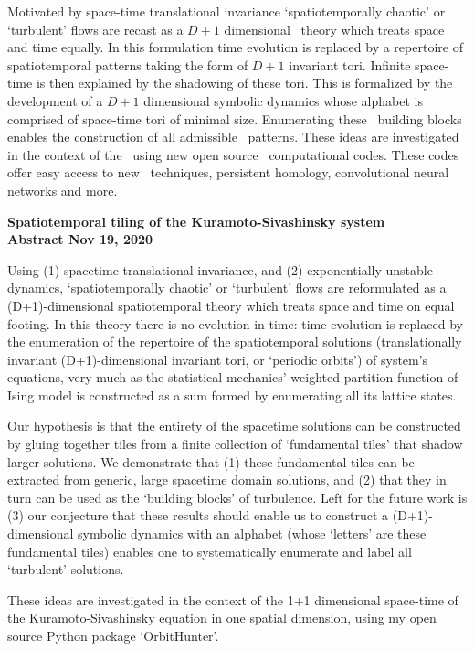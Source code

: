 

Motivated by space-time translational invariance
`spatiotemporally chaotic' or `turbulent' flows are recast
as a $D+1$ dimensional \spt\ theory which treats space and time equally.
In this formulation time evolution is replaced by
a repertoire of spatiotemporal patterns taking the form of $D+1$ invariant tori.
Infinite space-time is then explained by the shadowing of these tori.
This is formalized by the development of a $D+1$ dimensional symbolic dynamics whose
alphabet is comprised of space-time tori of minimal size.
Enumerating these \spt\ building blocks enables
the construction of all admissible \spt\ patterns.
These ideas are investigated in the context of
the \KSe\ using new open source \spt\ computational codes.
These codes offer easy access to new \spt\ techniques,
persistent homology, convolutional neural networks and more.
\bigskip

\noindent
{\bf
Spatiotemporal tiling of the Kuramoto-Sivashinsky system
\\
Abstract Nov 19, 2020}

Using (1) spacetime translational invariance, and (2) exponentially
unstable dynamics, `spatiotemporally chaotic' or `turbulent' flows are
reformulated as a (D+1)-dimensional spatiotemporal theory which treats
space and time on equal footing. In this theory there is no evolution in
time: time evolution is replaced by the enumeration of the repertoire of
the spatiotemporal solutions (translationally invariant (D+1)-dimensional
invariant tori, or `periodic orbits') of system's equations, very much as
the statistical mechanics' weighted partition function of Ising model is
constructed as a sum formed by enumerating all its lattice states.

Our hypothesis is that the entirety of the spacetime solutions can be
constructed by gluing together tiles from a finite collection of
`fundamental tiles' that shadow larger solutions.  We demonstrate that
(1) these fundamental tiles can be extracted from generic,  large
spacetime domain solutions, and (2) that they in turn can be used as the
`building blocks' of turbulence.  Left for the future work is (3) our
conjecture that these results should enable us to construct a
(D+1)-dimensional symbolic dynamics with an alphabet (whose `letters' are
these fundamental tiles) enables one to systematically enumerate and
label all `turbulent' solutions.

These ideas are investigated in the context of the 1+1 dimensional
space-time of the Kuramoto-Sivashinsky equation in one spatial dimension,
using my open source Python package `OrbitHunter'.
